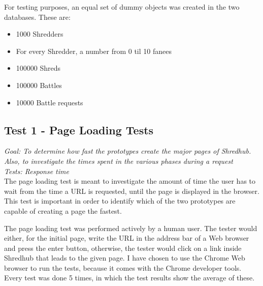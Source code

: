 For testing purposes, an equal set of dummy objects was created in the two databases. These are:
\begin{itemize}
\item{} 1000 Shredders 
\item{} For every Shredder, a number from 0 til 10 fanees
\item{} 100000 Shreds
\item{} 100000 Battles
\item{} 10000 Battle requests
\end{itemize}

\subsection{Test 1 - Page Loading Tests}
\textit{Goal: To determine how fast the prototypes create the major pages of Shredhub. Also, to investigate the times spent in the various phases during a request}\\
\textit{Tests: Response time}\\
The page loading test is meant to investigate the amount of time the user has to wait from the time a URL is requested, until the  page is displayed in the browser. This test is important in order to identify which of the two prototypes are capable of creating a page the fastest. 

The page loading test was performed actively by a human user. The tester would either, for the initial page, write the URL in the address bar of a Web browser and press the enter button, otherwise, the tester would click on a link inside Shredhub that leads to the given page. I have chosen to use the Chrome Web browser to run the tests, because it comes with the Chrome developer tools. Every test was done 5 times, in which the test results show the average of these.

